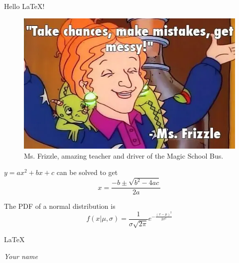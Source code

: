 \documentclass{article} %
\begin{document}
Hello \LaTeX!

\begin{figure}[h]
\centering
\includegraphics[width=.5\textwidth]{../../images/gen-prog/ms-frizzle.png}
\caption{Ms. Frizzle, amazing teacher and driver of the Magic School Bus.}
\end{figure}

$y = ax^2 + bx + c$ can be solved to get $$x = \frac{-b \pm \sqrt{b^2 - 4ac}}{2a}$$

The PDF of a normal distribution is $$f(x | \mu, \sigma) = \frac{1}{\sigma\sqrt{2\pi}} e^{-\frac{(x - \mu)^2}{2\sigma^2}}$$


\Huge\LaTeX


\tiny\emph{Your name}
\end{document}
